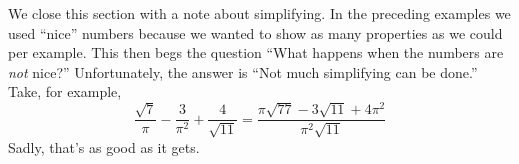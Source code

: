 \documentclass{ximera}
\begin{document}
\medskip

We close this section with a note about simplifying.  In the preceding examples we used ``nice'' numbers because we wanted to show as many properties as we could per example. This then begs the question ``What happens when the numbers are \emph{not} nice?''  Unfortunately, the answer is ``Not much simplifying can be done.''  Take, for example,\[\frac{\sqrt{7}}{\pi} - \frac{3}{\pi^{2}} + \frac{4}{\sqrt{11}} = \frac{\pi\sqrt{77} - 3\sqrt{11} + 4\pi^{2}}{\pi^{2}\sqrt{11}}\]Sadly, that's as good as it gets.



\closegraphsfile
\end{document}
